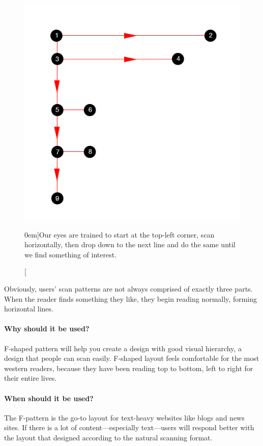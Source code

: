 \begin{figure}%
  \includegraphics[width=1\textwidth]{../figures/f-pattern.png}
  \caption[][0em]{Our eyes are trained to start at the top-left corner, scan horizontally, then drop down to the next line and do the same until we find something of interest.}
  \label{fig:f-layout}
\end{figure}

Obviously, users’ scan patterns are not always comprised of exactly three parts. When the reader finds something they like, they begin reading normally, forming horizontal lines.

\paragraph{Why should it be used?}
F-shaped pattern will help you create a design with good visual hierarchy, a design that people can scan easily. F-shaped layout feels comfortable for the most western readers, because they have been reading top to bottom, left to right for their entire lives.

\paragraph{When should it be used?}
The F-pattern is the go-to layout for text-heavy websites like blogs and news sites. If there is a lot of content---especially text---users will respond better with the layout that designed according to the natural scanning format.


